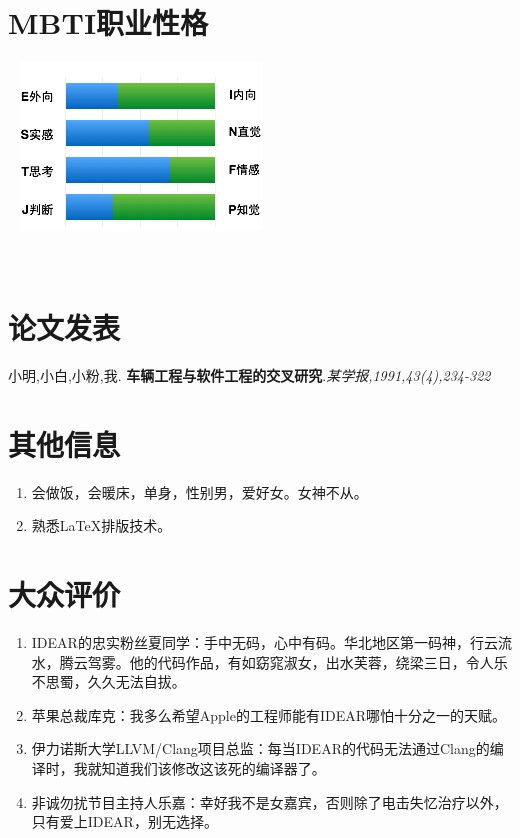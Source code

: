 \documentclass[]{friggeri-cv}
\begin{document}
\begin{aside}
~
~
~
  \section{MBTI职业性格}
  ~
    \includegraphics[scale=0.5]{img/personal.png}
    ~
\end{aside}

~
\section{论文发表}
小明,小白,小粉,我.
\textbf{车辆工程与软件工程的交叉研究}.\emph{某学报,1991,43(4),234-322}
\\
\section{其他信息}
\begin{enumerate}
\item 会做饭，会暖床，单身，性别男，爱好女。女神不从。
\item 熟悉\LaTeX 排版技术。
\end{enumerate}

\section{大众评价}
\begin{enumerate}
\item IDEAR的忠实粉丝夏同学：手中无码，心中有码。华北地区第一码神，行云流水，腾云驾雾。他的代码作品，有如窈窕淑女，出水芙蓉，绕梁三日，令人乐不思蜀，久久无法自拔。
\item 苹果总裁库克：我多么希望Apple的工程师能有IDEAR哪怕十分之一的天赋。
\item 伊力诺斯大学LLVM/Clang项目总监：每当IDEAR的代码无法通过Clang的编译时，我就知道我们该修改这该死的编译器了。
\item 非诚勿扰节目主持人乐嘉：幸好我不是女嘉宾，否则除了电击失忆治疗以外，只有爱上IDEAR，别无选择。
\end{enumerate}
\end{document}
